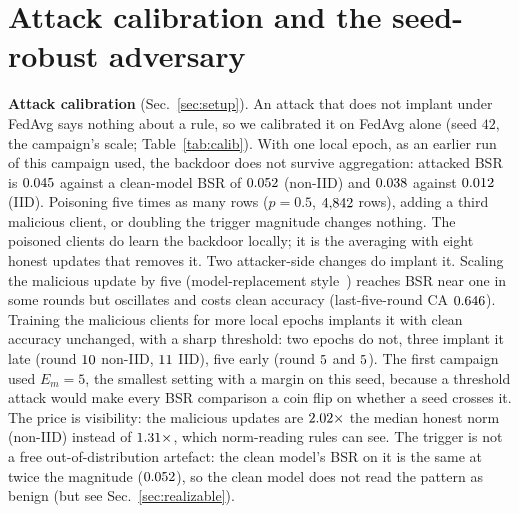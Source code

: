 \documentclass[journal]{IEEEtran}
\begin{document}
\section{Attack calibration and the seed-robust adversary}
\label{sup:calib}
\textbf{Attack calibration} (Sec.~\ref{sec:setup}). An attack that does not implant under
FedAvg says nothing about a rule, so we calibrated it on FedAvg alone (seed $42$, the
campaign's scale; Table~\ref{tab:calib}). With one local epoch, as an earlier run of this campaign
used, the backdoor does not survive aggregation: attacked BSR is
$0.045$ against a clean-model BSR of $0.052$ (non-IID) and
$0.038$ against $0.012$ (IID). Poisoning five times as many rows
($p=0.5$, $4{,}842$ rows), adding a third malicious client, or doubling the
trigger magnitude changes nothing. The poisoned clients do learn the backdoor
locally; it is the averaging with eight honest updates that removes it. Two
attacker-side changes do implant it. Scaling the malicious update by five
(model-replacement style~\cite{bagdasaryan2020}) reaches BSR near one in
some rounds but oscillates and costs clean accuracy (last-five-round CA
$0.646$). Training the malicious clients for more local epochs
implants it with clean accuracy unchanged, with a sharp threshold: two epochs do
not, three implant it late (round $10$ non-IID,
$11$ IID), five early (round $5$ and
$5$). The first campaign used $E_m=5$, the smallest setting
with a margin on this seed, because a threshold attack would make every BSR comparison a coin flip
on whether a seed crosses it. The price is visibility: the malicious updates are
$2.02\times$ the median honest norm (non-IID) instead of
$1.31\times$, which norm-reading rules can see. The trigger is not a
free out-of-distribution artefact: the clean model's BSR on it is the same at
twice the magnitude ($0.052$), so the clean model does not read the
pattern as benign (but see Sec.~\ref{sec:realizable}).
\end{document}
